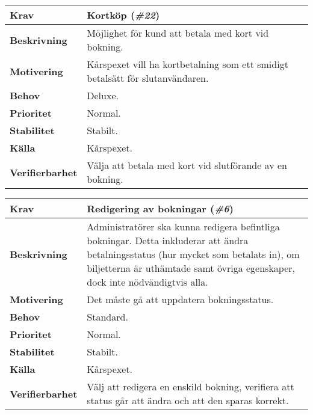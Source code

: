 \documentclass[a4paper, twoside, 11pt, titlepage]{article}
\begin{document}
		\begin{tabular} { p{2.6cm} p{12.5cm} }
			\hline
			\sffamily\textbf{Krav} & Kortköp (\emph{\#22})  \\
			\hline
			\sffamily\textbf{Beskrivning} & Möjlighet för kund att betala med kort vid bokning.  \\
			\hline
			\sffamily\textbf{Motivering} & Kårspexet vill ha kortbetalning som ett smidigt betalsätt för slutanvändaren.  \\
			\hline
			\sffamily\textbf{Behov} & Deluxe.  \\
			\hline
			\sffamily\textbf{Prioritet} & Normal.  \\
			\hline
			\sffamily\textbf{Stabilitet} & Stabilt.  \\
			\hline
			\sffamily\textbf{Källa} & Kårspexet.  \\
			\hline
			\sffamily\textbf{Verifierbarhet} & Välja att betala med kort vid slutförande av en bokning.  \\
			\hline
		\end{tabular}
		\vspace{6mm}

		\begin{tabular} { p{2.6cm} p{12.5cm} }
			\hline
			\sffamily\textbf{Krav} & Redigering av bokningar (\emph{\#6})  \\
			\hline
			\sffamily\textbf{Beskrivning} & Administratörer ska kunna redigera befintliga bokningar. Detta inkluderar att ändra betalningsstatus (hur mycket som betalats in), om biljetterna är uthämtade samt övriga egenskaper, dock inte nödvändigtvis alla.  \\
			\hline
			\sffamily\textbf{Motivering} & Det måste gå att uppdatera bokningsstatus.  \\
			\hline
			\sffamily\textbf{Behov} & Standard.  \\
			\hline
			\sffamily\textbf{Prioritet} & Normal.  \\
			\hline
			\sffamily\textbf{Stabilitet} & Stabilt.  \\
			\hline
			\sffamily\textbf{Källa} & Kårspexet.  \\
			\hline
			\sffamily\textbf{Verifierbarhet} & Välj att redigera en enskild bokning, verifiera att status går att ändra och att den sparas korrekt.  \\
			\hline
		\end{tabular}
		\vspace{6mm}
\end{document}
